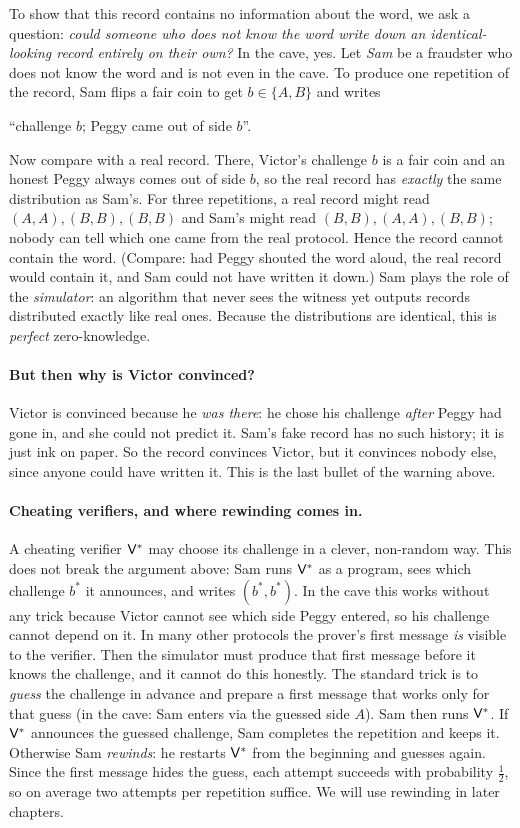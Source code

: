 \documentclass[11pt,a4paper]{report}
\theoremstyle{plain}
\theoremstyle{definition}
\theoremstyle{remark}
\begin{document}
To show that this record contains no information about the word, we ask a question: \emph{could someone who does not know the word write down an identical-looking record entirely on their own?} In the cave, yes. Let \emph{Sam} be a fraudster who does not know the word and is not even in the cave. To produce one repetition of the record, Sam flips a fair coin to get $b\in\{A,B\}$ and writes
\begin{center}``challenge $b$; Peggy came out of side $b$''.\end{center}
Now compare with a real record. There, Victor's challenge $b$ is a fair coin and an honest Peggy always comes out of side $b$, so the real record has \emph{exactly} the same distribution as Sam's. For three repetitions, a real record might read $(A,A),(B,B),(B,B)$ and Sam's might read $(B,B),(A,A),(B,B)$; nobody can tell which one came from the real protocol. Hence the record cannot contain the word. (Compare: had Peggy shouted the word aloud, the real record would contain it, and Sam could not have written it down.) Sam plays the role of the \emph{simulator}: an algorithm that never sees the witness yet outputs records distributed exactly like real ones. Because the distributions are identical, this is \emph{perfect} zero-knowledge.

\paragraph{But then why is Victor convinced?} Victor is convinced because he \emph{was there}: he chose his challenge \emph{after} Peggy had gone in, and she could not predict it. Sam's fake record has no such history; it is just ink on paper. So the record convinces Victor, but it convinces nobody else, since anyone could have written it. This is the last bullet of the warning above.

\paragraph{Cheating verifiers, and where rewinding comes in.} A cheating verifier $\mathsf{V}^*$ may choose its challenge in a clever, non-random way. This does not break the argument above: Sam runs $\mathsf{V}^*$ as a program, sees which challenge $b^*$ it announces, and writes $(b^*,b^*)$. In the cave this works without any trick because Victor cannot see which side Peggy entered, so his challenge cannot depend on it. In many other protocols the prover's first message \emph{is} visible to the verifier. Then the simulator must produce that first message before it knows the challenge, and it cannot do this honestly. The standard trick is to \emph{guess} the challenge in advance and prepare a first message that works only for that guess (in the cave: Sam enters via the guessed side $A$). Sam then runs $\mathsf{V}^*$. If $\mathsf{V}^*$ announces the guessed challenge, Sam completes the repetition and keeps it. Otherwise Sam \emph{rewinds}: he restarts $\mathsf{V}^*$ from the beginning and guesses again. Since the first message hides the guess, each attempt succeeds with probability $\tfrac12$, so on average two attempts per repetition suffice. We will use rewinding in later chapters.
\end{document}
